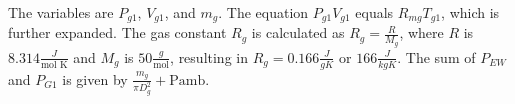 The variables are \( P_{g1} \), \( V_{g1} \), and \( m_g \). The equation \( P_{g1} V_{g1} \) equals \( R_{mg} T_{g1} \), which is further expanded. The gas constant \( R_g \) is calculated as \( R_g = \frac{R}{M_g} \), where \( R \) is \( 8.314 \frac{J}{\text{mol K}} \) and \( M_g \) is \( 50 \frac{g}{\text{mol}} \), resulting in \( R_g = 0.166 \frac{J}{g K} \) or \( 166 \frac{J}{kg K} \). The sum of \( P_{EW} \) and \( P_{G1} \) is given by \( \frac{m_g}{\pi D^2_g} + \text{Pamb} \).